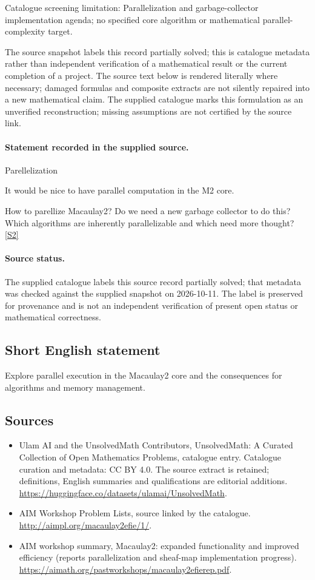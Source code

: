 \documentclass[11pt]{article}
\begin{document}
Catalogue screening limitation: Parallelization and garbage-collector implementation agenda; no specified core algorithm or mathematical parallel-complexity target.

The source snapshot labels this record partially solved; this is catalogue metadata rather than independent verification of a mathematical result or the current completion of a project.
The source text below is rendered literally where necessary; damaged formulas and composite extracts are not silently repaired into a new mathematical claim.
The supplied catalogue marks this formulation as an unverified reconstruction; missing assumptions are not certified by the source link.
\paragraph{Statement recorded in the supplied source.}
Parellelization

It would be nice to have parallel computation in the M2 core.

How to parellize Macaulay2? Do we need a new garbage collector to do this? Which algorithms are inherently parallelizable and which need more thought? \href{http://aimpl.org/macaulay2efie/1/}{[S2]}
\paragraph{Source status.}
The supplied catalogue labels this source record partially solved; that metadata was checked against the supplied snapshot on 2026-10-11. The label is preserved for provenance and is not an independent verification of present open status or mathematical correctness.
\subsection{Short English statement}
Explore parallel execution in the Macaulay2 core and the consequences for algorithms and memory management.
\subsection{Sources}
\begin{itemize}
\item[S1] Ulam AI and the UnsolvedMath Contributors, UnsolvedMath: A Curated Collection of Open Mathematics Problems, catalogue entry. Catalogue curation and metadata: CC BY 4.0. The source extract is retained; definitions, English summaries and qualifications are editorial additions.
\url{https://huggingface.co/datasets/ulamai/UnsolvedMath}.
\item[S2] AIM Workshop Problem Lists, source linked by the catalogue.
\url{http://aimpl.org/macaulay2efie/1/}.
\item[S3] AIM workshop summary, Macaulay2: expanded functionality and improved efficiency (reports parallelization and sheaf-map implementation progress).
\url{https://aimath.org/pastworkshops/macaulay2efierep.pdf}.
\end{itemize}
\end{document}
